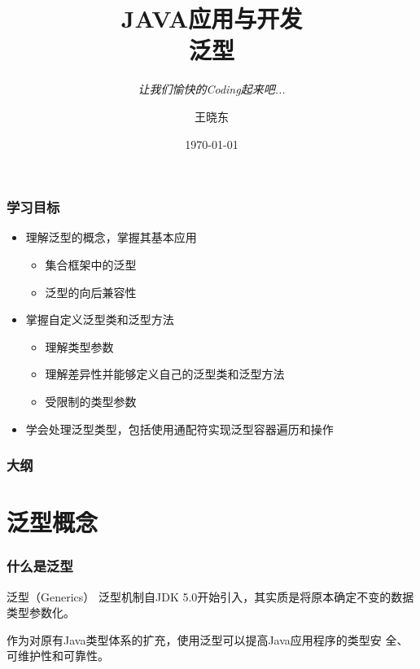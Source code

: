
\title{\hei JAVA应用与开发\\  泛\quad 型}
\subtitle{\it 让我们愉快的Coding起来吧...}
\author{王晓东}
\date{\today}



\begin{frame}
  \maketitle
\end{frame}

\begin{frame}
  \frametitle{学习目标}

  \begin{itemize}
  \item 理解泛型的概念，掌握其基本应用
    \begin{itemize}
    \item 集合框架中的泛型
    \item 泛型的向后兼容性
    \end{itemize}
  \item 掌握自定义泛型类和泛型方法
    \begin{itemize}
    \item 理解类型参数
    \item 理解差异性并能够定义自己的泛型类和泛型方法
    \item 受限制的类型参数
    \end{itemize}
  \item 学会处理泛型类型，包括使用通配符实现泛型容器遍历和操作
  \end{itemize}
\end{frame}

\begin{frame}
  \frametitle{大纲}
  \tableofcontents
\end{frame}

\section{泛型概念}

\begin{frame}[fragile] %
  \frametitle{什么是泛型}

  \begin{block}{泛型（Generics）}
    泛型机制自JDK 5.0开始引入，其实质是{\hei\Blue 将原本确定不变的数据
      类型参数化}。

    作为对原有Java类型体系的扩充，使用泛型可以提高Java应用程序的类型安
    全、可维护性和可靠性。
  \end{block}
\end{frame}

